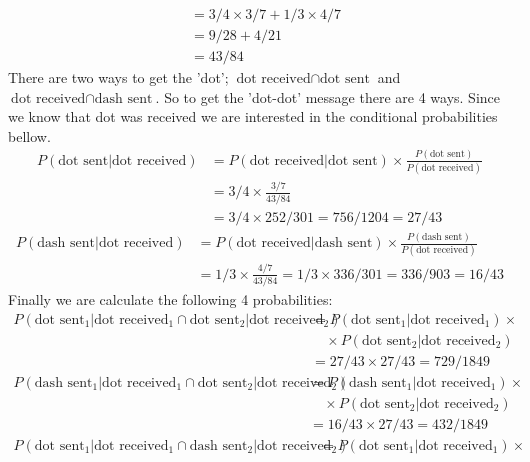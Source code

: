 \documentclass[a4paper]{article}
\begin{document}
\begin{enumerate}
\begin{enumerate}
\begin{align}
      &=3/4\times3/7+1/3\times4/7\nonumber\\
      &=9/28+4/21\nonumber\\
      &=43/84
      \end{align}
      There are two ways to get the 'dot'; $\text{dot received}\cap\text{dot
      sent}$ and $\text{dot received}\cap\text{dash sent}$. So to get the
      'dot-dot' message there are 4 ways. Since we know that dot was received
      we are interested in the conditional probabilities bellow.
      \begin{align}
      P(\text{dot sent}|\text{dot received})&=P(\text{dot received}|\text{dot
      sent})\times\frac{P(\text{dot sent})}{P(\text{dot received})}\nonumber\\
      &=3/4\times\frac{3/7}{43/84}\nonumber\\
      &=3/4\times252/301=756/1204=27/43
      \end{align}
      \begin{align}
      P(\text{dash sent}|\text{dot received})&=P(\text{dot
      received}|\text{dash sent})\times\frac{P(\text{dash sent})}{P(\text{dot
      received})}\nonumber\\
      &=1/3\times\frac{4/7}{43/84}=1/3\times336/301=336/903=16/43
      \end{align}
      Finally we are calculate the following 4 probabilities:
      \begin{align}
      P(\text{dot sent}_1|\text{dot received}_1\cap\text{dot sent}_2|\text{dot
      received}_2)&=P(\text{dot sent}_1|\text{dot received}_1)\times\nonumber\\
      &\quad\times P(\text{dot sent}_2|\text{dot received}_2)\nonumber\\
      &=27/43\times27/43=729/1849
      \end{align}
      \begin{align}
      P(\text{dash sent}_1|\text{dot received}_1\cap\text{dot sent}_2|\text{dot
      received}_2)&=P(\text{dash sent}_1|\text{dot received}_1)\times\nonumber\\
      &\quad\times P(\text{dot sent}_2|\text{dot received}_2)\nonumber\\
      &=16/43\times27/43=432/1849
      \end{align}
      \begin{align}
      P(\text{dot sent}_1|\text{dot received}_1\cap\text{dash sent}_2|\text{dot
      received}_2)&=P(\text{dot sent}_1|\text{dot received}_1)\times\nonumber\\

\end{align}
\end{enumerate}
\end{enumerate}
\end{document}
